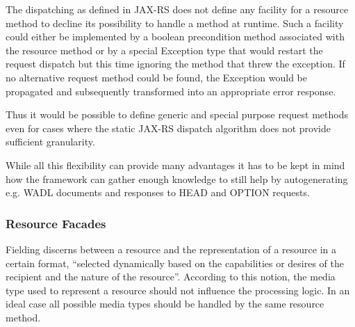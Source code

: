 \documentclass[12pt,a4paper,twoside]{scrartcl}		%
\begin{document}

The dispatching as defined in JAX-RS does not define any facility for a resource
method to decline its possibility to handle a method at runtime. Such a facility
could either be implemented by a boolean precondition method associated with the
resource method or by a special Exception type that would restart the request
dispatch but this time ignoring the method that threw the exception. If no
alternative request method could be found, the Exception would be propagated and
subsequently transformed into an appropriate error response.

Thus it would be possible to define generic and special purpose request methods
even for cases where the static JAX-RS dispatch algorithm does not provide
sufficient granularity.

While all this flexibility can provide many advantages it has to be kept in mind
how the framework can gather enough knowledge to still help by autogenerating
e.g. WADL documents and responses to HEAD and OPTION requests.

\subsubsection{Resource Facades}
\label{sec:resourcefacades}
Fielding discerns between a resource and the representation of a resource in a
certain format, ``selected dynamically based on the capabilities or desires of
the recipient and the nature of the resource''\cite[p. 87]{Fielding2000}.
According to this notion, the media type used to represent a resource should not
influence the processing logic. In an ideal case all possible media types should
be handled by the same resource method.

\end{document}
